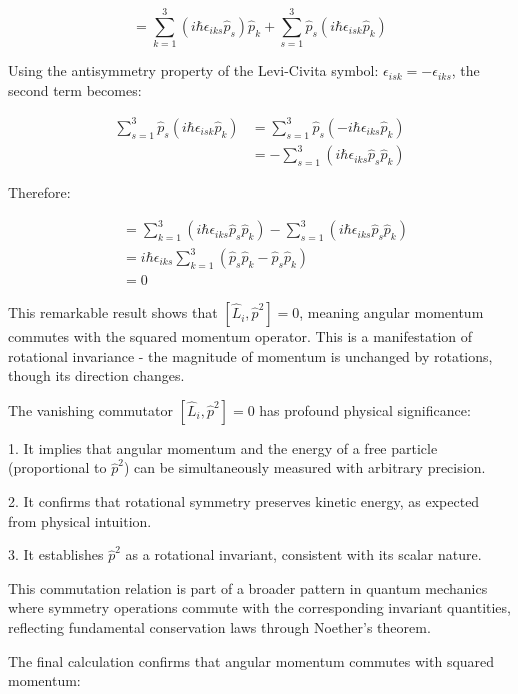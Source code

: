 \documentclass[italian]{HKNdocument}
\begin{document}
\begin{equation*}
[\hat{L}_i, \hat{p}^2] = \sum_{k=1}^{3}(i\hbar\epsilon_{iks}\hat{p}_s)\hat{p}_k + \sum_{s=1}^{3}\hat{p}_s(i\hbar\epsilon_{isk}\hat{p}_k) \tag{1.72}
\end{equation*}

Using the antisymmetry property of the Levi-Civita symbol: $\epsilon_{isk} = -\epsilon_{iks}$, the second term becomes:

\begin{align*}
\sum_{s=1}^{3}\hat{p}_s(i\hbar\epsilon_{isk}\hat{p}_k) &= \sum_{s=1}^{3}\hat{p}_s(-i\hbar\epsilon_{iks}\hat{p}_k) \\
&= -\sum_{s=1}^{3}(i\hbar\epsilon_{iks}\hat{p}_s\hat{p}_k)
\end{align*}

Therefore:

\begin{align*}
[\hat{L}_i, \hat{p}^2] &= \sum_{k=1}^{3}(i\hbar\epsilon_{iks}\hat{p}_s\hat{p}_k) - \sum_{s=1}^{3}(i\hbar\epsilon_{iks}\hat{p}_s\hat{p}_k) \\
&= i\hbar\epsilon_{iks}\sum_{k=1}^{3}(\hat{p}_s\hat{p}_k - \hat{p}_s\hat{p}_k) \\
&= 0
\end{align*}

This remarkable result shows that $[\hat{L}_i, \hat{p}^2] = 0$, meaning angular momentum commutes with the squared momentum operator. This is a manifestation of rotational invariance - the magnitude of momentum is unchanged by rotations, though its direction changes.

The vanishing commutator $[\hat{L}_i, \hat{p}^2] = 0$ has profound physical significance:

1. It implies that angular momentum and the energy of a free particle (proportional to $\hat{p}^2$) can be simultaneously measured with arbitrary precision.

2. It confirms that rotational symmetry preserves kinetic energy, as expected from physical intuition.

3. It establishes $\hat{p}^2$ as a rotational invariant, consistent with its scalar nature.

This commutation relation is part of a broader pattern in quantum mechanics where symmetry operations commute with the corresponding invariant quantities, reflecting fundamental conservation laws through Noether's theorem.


The final calculation confirms that angular momentum commutes with squared momentum:
\end{document}
